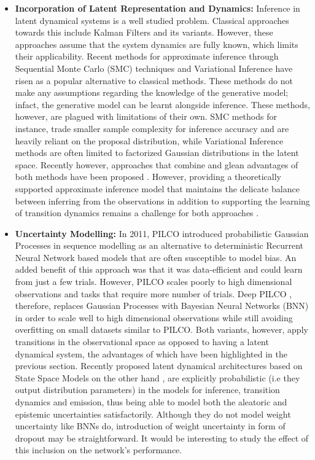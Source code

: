 \documentclass[10pt,twocolumn,letterpaper]{article}
\begin{document}
	\begin{itemize}
		\item \textbf{Incorporation of Latent Representation and Dynamics:} Inference in latent dynamical systems is a well studied problem. Classical approaches towards this include Kalman Filters and its variants\cite{kalman1960contributions, kalman1961new, wan2000unscented}. However, these approaches assume that the system dynamics are fully known, which limits their applicability. Recent methods for approximate inference through Sequential Monte Carlo (SMC) techniques \cite{doucet2001introduction} and Variational Inference \cite{bayer2014learning, chung2015recurrent, karl2016deep} have risen as a popular alternative to classical methods. These methods do not make any assumptions regarding the knowledge of the generative model; infact, the generative model can be learnt alongside inference. These methods, however, are plagued with limitations of their own. SMC methods for instance, trade smaller sample complexity for inference accuracy and are heavily reliant on the proposal distribution, while Variational Inference methods are often limited to factorized Gaussian distributions in the latent space. Recently however, approaches that combine and glean advantages of both methods have been proposed \cite{gu2015neural, naesseth2017variational}. However, providing a theoretically supported approximate inference model that maintains the delicate balance between inferring from the observations in addition to supporting the learning of transition dynamics remains a challenge for both approaches \cite{karl2016deep}.
		\item \textbf{Uncertainty Modelling:} In 2011, PILCO \cite{deisenroth2011pilco} introduced probabilistic Gaussian Processes in sequence modelling as an alternative to deterministic Recurrent Neural Network based models that are often susceptible to model bias. An added benefit of this approach was that it was data-efficient and could learn from just a few trials. However, PILCO scales poorly to high dimensional observations and tasks that require more number of trials. Deep PILCO \cite{gal2016improving}, therefore, replaces Gaussian Processes with Bayesian Neural Networks (BNN) in order to scale well to high dimensional observations while still avoiding overfitting on small datasets similar to PILCO. Both variants, however, apply transitions in the observational space as opposed to having a latent dynamical system, the advantages of which have been highlighted in the previous section. Recently proposed latent dynamical architectures based on State Space Models on the other hand \cite{karl2016deep, krishnan2015deep}, are explicitly probabilistic (i.e they output distribution parameters) in the models for inference, transition dynamics and emission, thus being able to model both the aleatoric and epistemic uncertainties satisfactorily. Although they do not model weight uncertainty like BNNs do, introduction of weight uncertainty in form of dropout \cite{gal2016dropout} may be straightforward. It would be interesting to study the effect of this inclusion on the network's performance. 

\end{itemize}
\end{document}
